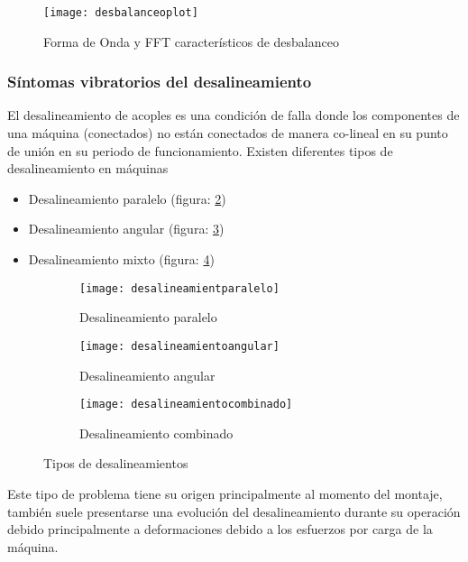 	 				\begin{figure}
	 					\centering
	 					\texttt{[image: desbalanceoplot]}
	 					\caption{Forma de Onda y FFT característicos de desbalanceo}
	 					\label{fig:desbgrafico}
	 				\end{figure}
 				\subsubsection{Síntomas vibratorios del desalineamiento}
 					El desalineamiento de acoples es una condición de falla donde los componentes de una máquina (conectados) no están conectados de manera co-lineal en su punto de unión en su periodo de funcionamiento. Existen diferentes tipos de desalineamiento en máquinas
 					\begin{itemize}
 						\item Desalineamiento paralelo (figura: \ref{fig:desparalelo})
 						\item Desalineamiento angular (figura: \ref{fig:desangular})
 						\item Desalineamiento mixto (figura: \ref{fig:desmixto})
 					\end{itemize}
	 				\begin{figure}
	 					\centering
	 					\begin{subfigure}[b]{0.4\textwidth}
	 						\texttt{[image: desalineamientparalelo]}
	 						\caption{Desalineamiento paralelo}
	 						\label{fig:desparalelo}
	 					\end{subfigure}			    
	 					\begin{subfigure}[b]{0.4\textwidth}
	 						\texttt{[image: desalineamientoangular]}
	 						\caption{Desalineamiento angular}
	 						\label{fig:desangular}
	 					\end{subfigure}
	 					\begin{subfigure}[b]{0.5\textwidth}
	 						\texttt{[image: desalineamientocombinado]}
	 						\caption{Desalineamiento combinado}
	 						\label{fig:desmixto}
	 					\end{subfigure}
	 				
	 					\caption{Tipos de desalineamientos}
	 					\label{fig:tiposdedes}
	 				\end{figure}
	 				Este tipo de problema tiene su origen principalmente al momento del montaje, también suele presentarse una evolución del desalineamiento durante su operación debido principalmente a deformaciones debido a los esfuerzos por carga de la máquina.
	 			

